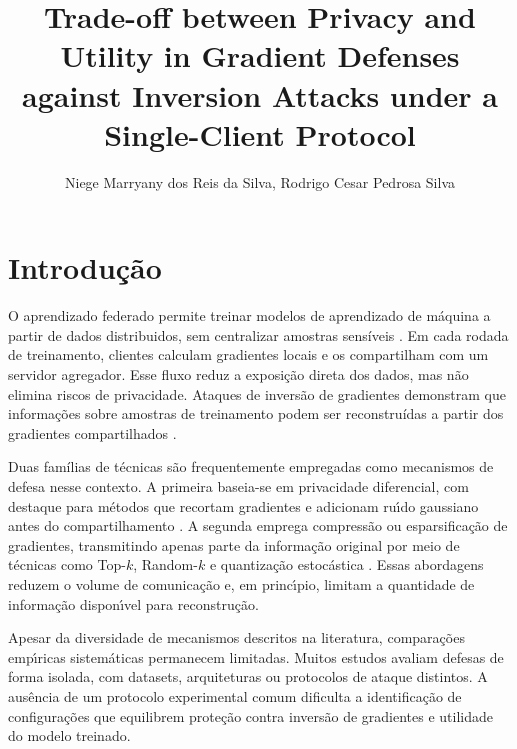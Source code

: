 \documentclass[kdmile,a4paper]{kdmile}
\title{Trade-off between Privacy and Utility in Gradient Defenses\\against Inversion Attacks under a Single-Client Protocol}
\author{Niege Marryany dos Reis da Silva\inst{1}, Rodrigo Cesar Pedrosa Silva\inst{1}}
\institute{Universidade Federal de Ouro Preto, Brazil \\ \email{niege.silva@aluno.ufop.edu.br} \\ \email{rodrigo.silva@ufop.edu.br}}
\begin{document}
\begin{bottomstuff}
\end{bottomstuff}

\maketitle

\section{Introdu\c{c}\~{a}o}
\label{sec:introducao}

O aprendizado federado permite treinar modelos de aprendizado de m\'{a}quina a partir de dados distribuidos, sem centralizar amostras sens\'{i}veis \cite{McMahan2017}. Em cada rodada de treinamento, clientes calculam gradientes locais e os compartilham com um servidor agregador. Esse fluxo reduz a exposi\c{c}\~{a}o direta dos dados, mas n\~{a}o elimina riscos de privacidade. Ataques de invers\~{a}o de gradientes demonstram que informa\c{c}\~{o}es sobre amostras de treinamento podem ser reconstru\'{i}das a partir dos gradientes compartilhados \cite{Zhu2019,Geiping2020}.

Duas fam\'{i}lias de t\'{e}cnicas s\~{a}o frequentemente empregadas como mecanismos de defesa nesse contexto. A primeira baseia-se em privacidade diferencial, com destaque para m\'{e}todos que recortam gradientes e adicionam ru\'{\i}do gaussiano antes do compartilhamento \cite{Abadi2016}. A segunda emprega compress\~{a}o ou esparsifica\c{c}\~{a}o de gradientes, transmitindo apenas parte da informa\c{c}\~{a}o original por meio de t\'{e}cnicas como Top-$k$, Random-$k$ e quantiza\c{c}\~{a}o estoc\'{a}stica \cite{Stich2018,Wangni2018,Alistarh2017}. Essas abordagens reduzem o volume de comunica\c{c}\~{a}o e, em princ\'{\i}pio, limitam a quantidade de informa\c{c}\~{a}o dispon\'{\i}vel para reconstru\c{c}\~{a}o.

Apesar da diversidade de mecanismos descritos na literatura, compara\c{c}\~{o}es emp\'{\i}ricas sistem\'{a}ticas permanecem limitadas. Muitos estudos avaliam defesas de forma isolada, com datasets, arquiteturas ou protocolos de ataque distintos. A aus\^{e}ncia de um protocolo experimental comum dificulta a identifica\c{c}\~{a}o de configura\c{c}\~{o}es que equilibrem prote\c{c}\~{a}o contra invers\~{a}o de gradientes e utilidade do modelo treinado.
\end{document}
